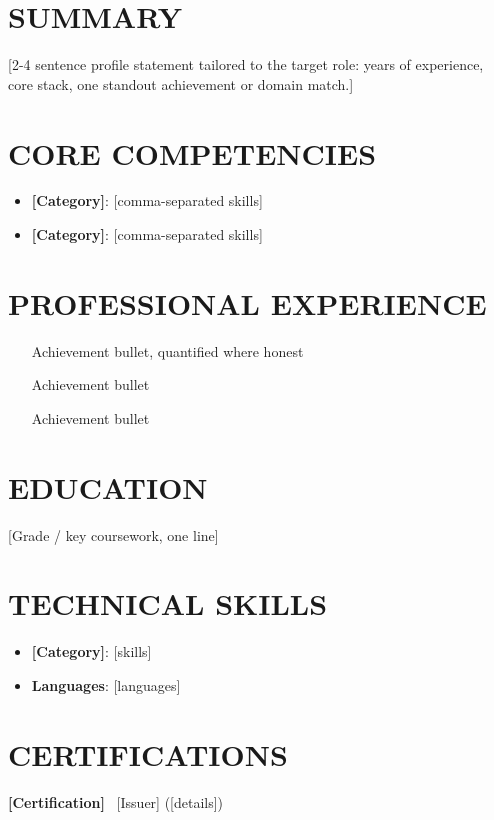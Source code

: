 \documentclass[11pt,a4paper]{article}
\begin{document}

\section{SUMMARY}
[2-4 sentence profile statement tailored to the target role: years of experience, core stack, one standout achievement or domain match.]

\section{CORE COMPETENCIES}
\begin{itemize}
\item \textbf{[Category]}: [comma-separated skills]
\item \textbf{[Category]}: [comma-separated skills]
\end{itemize}

\section{PROFESSIONAL EXPERIENCE}

\begin{itemize}
    \item [Achievement bullet, quantified where honest]
    \item [Achievement bullet]
\end{itemize}

\begin{itemize}
    \item [Achievement bullet]
\end{itemize}

\section{EDUCATION}

\cventryhead{[Degree] \textbar\ [Institution]}{[Start] -- [End]}
[Grade / key coursework, one line]

\section{TECHNICAL SKILLS}
\begin{itemize}
\item \textbf{[Category]}: [skills]
\item \textbf{Languages}: [languages]
\end{itemize}

\section{CERTIFICATIONS}
\textbf{[Certification]} \textbullet\ [Issuer] ([details])
\end{document}
